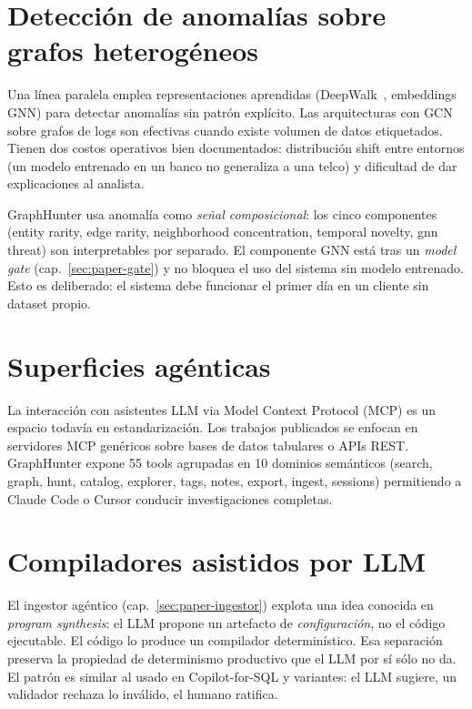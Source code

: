 \section{Detección de anomalías sobre grafos heterogéneos}

Una línea paralela emplea representaciones aprendidas
(DeepWalk~\cite{perozzi2014deepwalk}, embeddings GNN) para
detectar anomalías sin patrón explícito. Las arquitecturas con GCN
sobre grafos de logs son efectivas cuando existe volumen de datos
etiquetados. Tienen dos costos operativos bien documentados:
distribución shift entre entornos (un modelo entrenado en un banco
no generaliza a una telco) y dificultad de dar explicaciones al
analista.

GraphHunter usa anomalía como \emph{señal composicional}: los cinco
componentes (entity rarity, edge rarity, neighborhood
concentration, temporal novelty, gnn threat) son
interpretables por separado. El componente GNN está tras un
\emph{model gate} (cap.~\ref{sec:paper-gate}) y no bloquea el uso
del sistema sin modelo entrenado. Esto es deliberado: el sistema
debe funcionar el primer día en un cliente sin dataset propio.

\section{Superficies agénticas}

La interacción con asistentes LLM via Model Context Protocol (MCP)
es un espacio todavía en estandarización. Los trabajos publicados
se enfocan en servidores MCP genéricos sobre bases de datos
tabulares o APIs REST. GraphHunter expone 55 tools agrupadas en 10
dominios semánticos (search, graph, hunt, catalog,
explorer, tags, notes, export, ingest, sessions) permitiendo a
Claude Code o Cursor conducir investigaciones completas.

\section{Compiladores asistidos por LLM}

El ingestor agéntico (cap.~\ref{sec:paper-ingestor}) explota una
idea conocida en \emph{program synthesis}: el LLM propone un
artefacto de \emph{configuración}, no el código ejecutable. El
código lo produce un compilador determinístico. Esa separación
preserva la propiedad de determinismo productivo que el LLM por sí
sólo no da. El patrón es similar al usado en
Copilot-for-SQL y variantes: el LLM sugiere, un validador rechaza
lo inválido, el humano ratifica.
